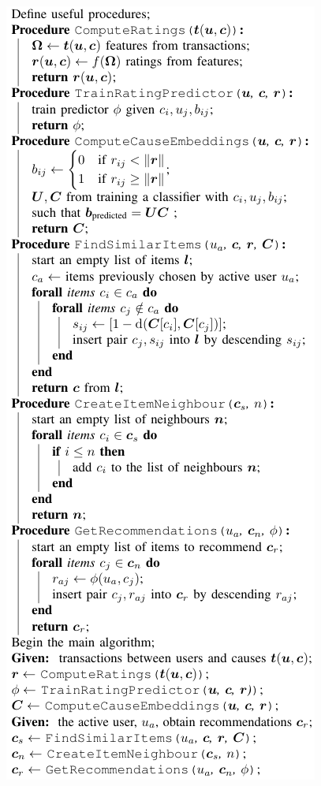 
    \begin{minipage}{.5\textwidth}
        \includegraphics[scale=0.4,trim=0 76ex 0 0,clip]{GraphicFiles/itembasedCF.png}
    \end{minipage}%
